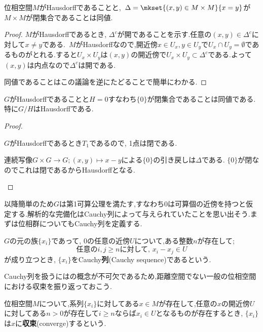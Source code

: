 \begin{prop}\label{prop:Hausdorffと対角線}
	位相空間$M$がHausdorffであることと,~$\Delta=\mkset{(x,y)\in M\times M}{x=y}$が$M\times M$が閉集合であることは同値.
\end{prop}
\begin{proof}
	$M$がHausdorffであるとき, $\Delta^c$が開であることを示す.任意の$(x,y)\in\Delta^c$に対して$x\neq y$である.~$M$がHausdorffなので,開近傍$x\in U_x,y\in U_y$で$U_x\cap U_y=\emptyset$であるものがとれる.すると$U_x\times U_y$は$(x,y)$の開近傍で$U_x\times U_y\subset\Delta^c$である.よって$(x,y)$は内点なので$\Delta^c$は開である.
	
	同値であることはこの議論を逆にたどることで簡単にわかる.
\end{proof}

\begin{prop}\label{prop:位相群がHdfになる条件}
	$G$がHausdorffであることと$H=0$すなわち$\{0\}$が閉集合であることは同値である.特に$G/H$はHausdorffである.
\end{prop}

\begin{proof}
	\begin{eqv}
		\item $G$がHausdorffであるとき$T_1$であるので, 1点は閉である.
		\item 連続写像$G\times G\to G;(x,y)\mapsto x-y$による$\{0\}$の引き戻しは$\Delta$である. $\{0\}$が閉なのでこれは閉であるからHausdorffとなる.
	\end{eqv}
\end{proof}

以降簡単のため$G$は第1可算公理を満たす,すなわち$0$は可算個の近傍を持つと仮定する.解析的な完備化はCauchy列によって与えられていたことを思い出そう.まずは位相群についてもCauchy列を定義する.

\begin{defi}[Cauchy列]
	$G$の元の族$\{x_i\}$であって, $0$の任意の近傍$U$について,ある整数$n$が存在して;
	\[\text{任意の}i,j\geq n\text{に対して, } x_i-x_j\in U\]
	が成り立つとき, $\{x_i\}$をCauchy\textbf{列}(Cauchy sequence)であるという.
\end{defi}

Cauchy列を扱うにはの概念が不可欠であるため,距離空間でない一般の位相空間における収束を振り返っておこう.

\begin{defi}[収束]
	位相空間$M$について,系列$\{x_i\}$に対してある$x\in M$が存在して,任意の$x$の開近傍$U$に対してある$n>0$が存在して$i\geq n$ならば$x_i\in U$となるものが存在するとき, $\{x_i\}$は$x$に\textbf{収束}(converge)するという.
\end{defi}


